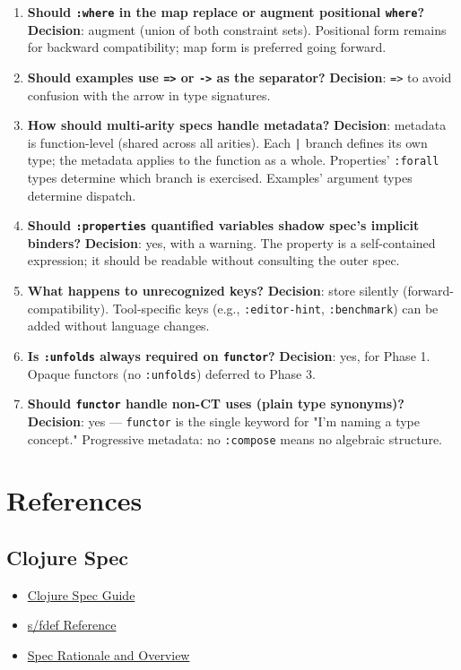 \documentclass[11pt]{article}
\begin{document}
\begin{enumerate}
\item \textbf{Should \texttt{:where} in the map replace or augment positional \texttt{where}?}
\textbf{Decision}: augment (union of both constraint sets). Positional form
remains for backward compatibility; map form is preferred going forward.

\item \textbf{Should examples use \texttt{=>} or \texttt{->} as the separator?}
\textbf{Decision}: \texttt{=>} to avoid confusion with the arrow in type signatures.

\item \textbf{How should multi-arity specs handle metadata?}
\textbf{Decision}: metadata is function-level (shared across all arities). Each
\texttt{|} branch defines its own type; the metadata applies to the function as a
whole. Properties' \texttt{:forall} types determine which branch is exercised.
Examples' argument types determine dispatch.

\item \textbf{Should \texttt{:properties} quantified variables shadow spec's implicit binders?}
\textbf{Decision}: yes, with a warning. The property is a self-contained
expression; it should be readable without consulting the outer spec.

\item \textbf{What happens to unrecognized keys?}
\textbf{Decision}: store silently (forward-compatibility). Tool-specific keys
(e.g., \texttt{:editor-hint}, \texttt{:benchmark}) can be added without language changes.

\item \textbf{Is \texttt{:unfolds} always required on \texttt{functor}?}
\textbf{Decision}: yes, for Phase 1. Opaque functors (no \texttt{:unfolds}) deferred to
Phase 3.

\item \textbf{Should \texttt{functor} handle non-CT uses (plain type synonyms)?}
\textbf{Decision}: yes --- \texttt{functor} is the single keyword for "I'm naming a type
concept." Progressive metadata: no \texttt{:compose} means no algebraic structure.
\end{enumerate}
\section{References}
\label{sec:org9941de5}

\subsection{Clojure Spec}
\label{sec:orgd4d199e}
\begin{itemize}
\item \href{https://clojure.org/guides/spec}{Clojure Spec Guide}
\item \href{https://clojuredocs.org/clojure.spec.alpha/fdef}{s/fdef Reference}
\item \href{https://clojure.org/about/spec}{Spec Rationale and Overview}
\end{itemize}
\end{document}
